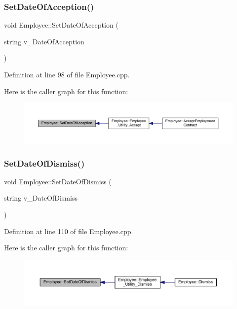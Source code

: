 \subsubsection{\texorpdfstring{Set\+Date\+Of\+Acception()}{SetDateOfAcception()}}
{\footnotesize\ttfamily void Employee\+::\+Set\+Date\+Of\+Acception (\begin{DoxyParamCaption}\item[{string}]{v\+\_\+\+Date\+Of\+Acception }\end{DoxyParamCaption})}



Definition at line 98 of file Employee.\+cpp.

Here is the caller graph for this function\+:
\nopagebreak
\begin{figure}[H]
\begin{center}
\leavevmode
\includegraphics[width=350pt]{class_employee_a62cc0f19d969528e061ad178a1b109ac_icgraph}
\end{center}
\end{figure}
\mbox{\label{class_employee_acbb98daeb702b22d616c8b7064784210}} 
\subsubsection{\texorpdfstring{Set\+Date\+Of\+Dismiss()}{SetDateOfDismiss()}}
{\footnotesize\ttfamily void Employee\+::\+Set\+Date\+Of\+Dismiss (\begin{DoxyParamCaption}\item[{string}]{v\+\_\+\+Date\+Of\+Dismiss }\end{DoxyParamCaption})}



Definition at line 110 of file Employee.\+cpp.

Here is the caller graph for this function\+:
\nopagebreak
\begin{figure}[H]
\begin{center}
\leavevmode
\includegraphics[width=350pt]{class_employee_acbb98daeb702b22d616c8b7064784210_icgraph}
\end{center}
\end{figure}
\mbox{\label{class_employee_a3ffb3c8c2dc4817f88801be832eb8caa}} 
